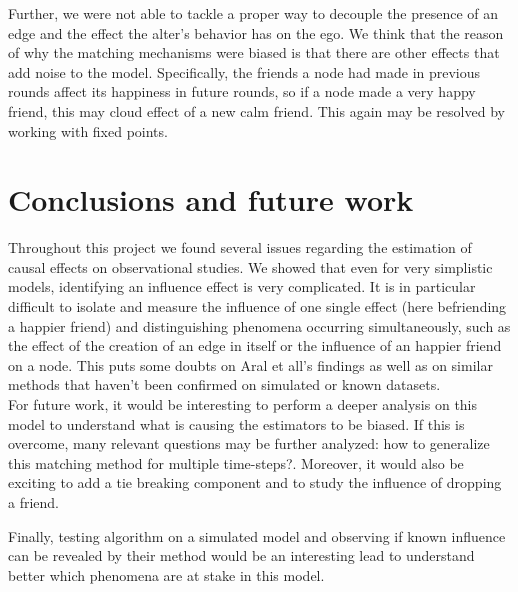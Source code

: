 \documentclass[11pt]{article}
\begin{document}
Further, we were not able to tackle a proper way to decouple the presence of an edge and the effect the alter's behavior has on the ego. We think that the reason of why the matching mechanisms were biased is that there are other effects that add noise to the model. Specifically, the friends a node had made in previous rounds affect its happiness in future rounds, so if a node made a very happy friend, this may cloud effect of a new calm friend. This again may be resolved by working with fixed points.
\FloatBarrier


\section{Conclusions and future work}
Throughout this project we found several issues regarding the estimation of causal effects on observational studies. We showed that even for very simplistic models, identifying an influence effect is very complicated. It is in particular difficult to isolate and measure the influence of one single effect (here befriending a happier friend) and distinguishing phenomena occurring simultaneously, such as the effect of the creation of an edge in itself or the influence of an happier friend on a node. This puts some doubts on Aral et all’s findings as well as on similar methods that haven’t been confirmed on simulated or known datasets. \\

For future work, it would be interesting to perform a deeper analysis on this model to understand what is causing the estimators to be biased. If this is overcome, many relevant questions may be further analyzed: how to generalize this matching method for multiple time-steps?. Moreover, it would also be exciting to add a tie breaking component and to study the influence of dropping a friend.

Finally, testing \citep{aral2009distinguishing} algorithm on a simulated model and observing if known influence can be revealed by their method would be an interesting lead to understand better which phenomena are at stake in this model.
	

\newpage


\nocite{*}
\end{document}
